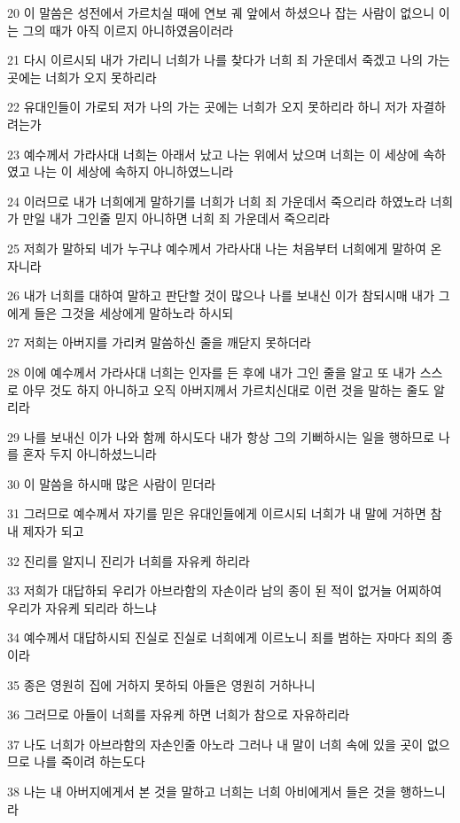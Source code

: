 \par 20 이 말씀은 성전에서 가르치실 때에 연보 궤 앞에서 하셨으나 잡는 사람이 없으니 이는 그의 때가 아직 이르지 아니하였음이러라
\par 21 다시 이르시되 내가 가리니 너희가 나를 찾다가 너희 죄 가운데서 죽겠고 나의 가는 곳에는 너희가 오지 못하리라
\par 22 유대인들이 가로되 저가 나의 가는 곳에는 너희가 오지 못하리라 하니 저가 자결하려는가
\par 23 예수께서 가라사대 너희는 아래서 났고 나는 위에서 났으며 너희는 이 세상에 속하였고 나는 이 세상에 속하지 아니하였느니라
\par 24 이러므로 내가 너희에게 말하기를 너희가 너희 죄 가운데서 죽으리라 하였노라 너희가 만일 내가 그인줄 믿지 아니하면 너희 죄 가운데서 죽으리라
\par 25 저희가 말하되 네가 누구냐 예수께서 가라사대 나는 처음부터 너희에게 말하여 온 자니라
\par 26 내가 너희를 대하여 말하고 판단할 것이 많으나 나를 보내신 이가 참되시매 내가 그에게 들은 그것을 세상에게 말하노라 하시되
\par 27 저희는 아버지를 가리켜 말씀하신 줄을 깨닫지 못하더라
\par 28 이에 예수께서 가라사대 너희는 인자를 든 후에 내가 그인 줄을 알고 또 내가 스스로 아무 것도 하지 아니하고 오직 아버지께서 가르치신대로 이런 것을 말하는 줄도 알리라
\par 29 나를 보내신 이가 나와 함께 하시도다 내가 항상 그의 기뻐하시는 일을 행하므로 나를 혼자 두지 아니하셨느니라
\par 30 이 말씀을 하시매 많은 사람이 믿더라
\par 31 그러므로 예수께서 자기를 믿은 유대인들에게 이르시되 너희가 내 말에 거하면 참 내 제자가 되고
\par 32 진리를 알지니 진리가 너희를 자유케 하리라
\par 33 저희가 대답하되 우리가 아브라함의 자손이라 남의 종이 된 적이 없거늘 어찌하여 우리가 자유케 되리라 하느냐
\par 34 예수께서 대답하시되 진실로 진실로 너희에게 이르노니 죄를 범하는 자마다 죄의 종이라
\par 35 종은 영원히 집에 거하지 못하되 아들은 영원히 거하나니
\par 36 그러므로 아들이 너희를 자유케 하면 너희가 참으로 자유하리라
\par 37 나도 너희가 아브라함의 자손인줄 아노라 그러나 내 말이 너희 속에 있을 곳이 없으므로 나를 죽이려 하는도다
\par 38 나는 내 아버지에게서 본 것을 말하고 너희는 너희 아비에게서 들은 것을 행하느니라
